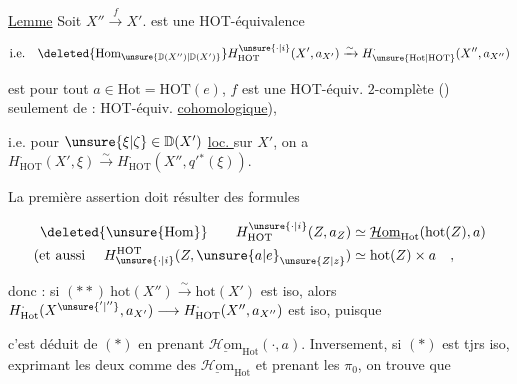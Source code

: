 \uline{Lemme} Soit $X''\overset{f}{\longrightarrow}X'$.  est une HOT-équivalence

\[
\text{i.e.}\quad \deleted{\mathrm{Hom}_{\unsure{\mathbb D(X'')|\mathbb D(X')}}}
H^{\unsure{\cdot|i}}_{\mathrm{HOT}}(X',a_{X'})\xrightarrow{\sim}
H^{\cdot}_{\unsure{\mathrm{Hot}|\mathrm{HOT}}}(X'',a_{X''})
\]

est  pour tout $a\in\mathrm{Hot}=\mathrm{HOT}(e)$,  $f$ est \deleted{\unsure{$=$}}  une HOT-équiv. $2$-complète ()  seulement de : HOT-équiv. \uline{cohomologique}),


i.e. pour   $\unsure{\xi|\zeta}\in\mathbb D(X')$ \uline{loc. } sur $X'$, on a $H^{\cdot}_{\mathrm{HOT}}(X',\xi)\xrightarrow{\sim}H^{\cdot}_{\mathrm{HOT}}(X'',q'{}^*(\xi))$\unsure{$($|/}.



\margin{$\unsure{\ast|\times}$}

La première assertion doit résulter des formules

\[
\begin{aligned}
\deleted{\unsure{\mathrm{Hom}}}\qquad H^{\unsure{\cdot|i}}_{\mathrm{HOT}}(Z,a_Z)&\simeq\underline{\mathcal H\mathrm{om}}_{\mathrm{Hot}}(\mathrm{hot}(Z),a)\\
(\text{et aussi }\quad H_{\unsure{\cdot|i}}^{\mathrm{HOT}}(Z,\unsure{a|e}_{\unsure{Z|z}})&\simeq\mathrm{hot}(Z)\times a\quad ,
\end{aligned}
\]


donc : si $(**)\ \mathrm{hot}(X'')\xrightarrow{\sim}\mathrm{hot}(X')$ est iso, alors $H^{\cdot}_{\mathrm{Hot}}(X^{\unsure{'|''}},a_{X'})\longrightarrow H^{\cdot}_{\mathrm{HOT}}(X'',a_{X''})$ est iso, puisque

c'est déduit de $(*)$ en prenant $\underline{\mathcal H\mathrm{om}}_{\mathrm{Hot}}(\cdot,a)$. Inversement, si $(*)$ est tjrs iso,  \margin{$\longrightarrow$}exprimant les deux  comme des $\underline{\mathcal H\mathrm{om}}_{\mathrm{Hot}}$ et prenant les $\pi_0$, on trouve que


